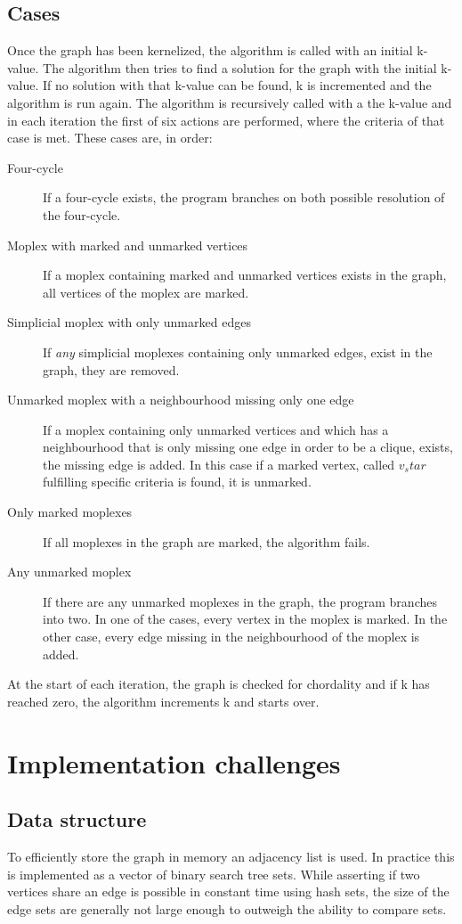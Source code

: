 \documentclass{article}
\begin{document}
		\subsection{Cases} 
		Once the graph has been kernelized, the algorithm is called with an initial k-value. The algorithm then tries to find a solution for the graph with the initial k-value.
		If no solution with that k-value can be found, k is incremented and the algorithm is run again.
		The algorithm is recursively called with a the k-value and in each iteration the first of six actions are performed, where the criteria of that case is met.
		These cases are, in order:
		\begin{description}
			\item[Four-cycle] If a four-cycle exists, the program branches on both possible resolution of the four-cycle.
			\item[Moplex with marked and unmarked vertices] If a moplex containing marked and unmarked vertices exists in the graph, all vertices of the moplex are marked.
			\item[Simplicial moplex with only unmarked edges] If \emph{any} simplicial moplexes containing only unmarked edges, exist in the graph, they are removed.
			\item[Unmarked moplex with a neighbourhood missing only one edge] If a moplex containing only unmarked vertices and which has a neighbourhood that is only missing one edge in order to be a clique, exists, the missing edge is added. In this case if a marked vertex, called $v_star$ fulfilling specific criteria is found, it is unmarked.
			\item[Only marked moplexes] If all moplexes in the graph are marked, the algorithm fails.
			\item[Any unmarked moplex] If there are any unmarked moplexes in the graph, the program branches into two. In one of the cases, every vertex in the moplex is marked. In the other case, every edge missing in the neighbourhood of the moplex is added.
		\end{description}

		At the start of each iteration, the graph is checked for chordality and if k has reached zero, the algorithm increments k and starts over.

	\section{Implementation challenges}

		\subsection{Data structure}
		To efficiently store the graph in memory an adjacency list is used.
		In practice this is implemented as a vector of binary search tree sets.
		While asserting if two vertices share an edge is possible in constant time using hash sets, the size of the edge sets are generally not large enough to outweigh the ability to compare sets.
\end{document}
